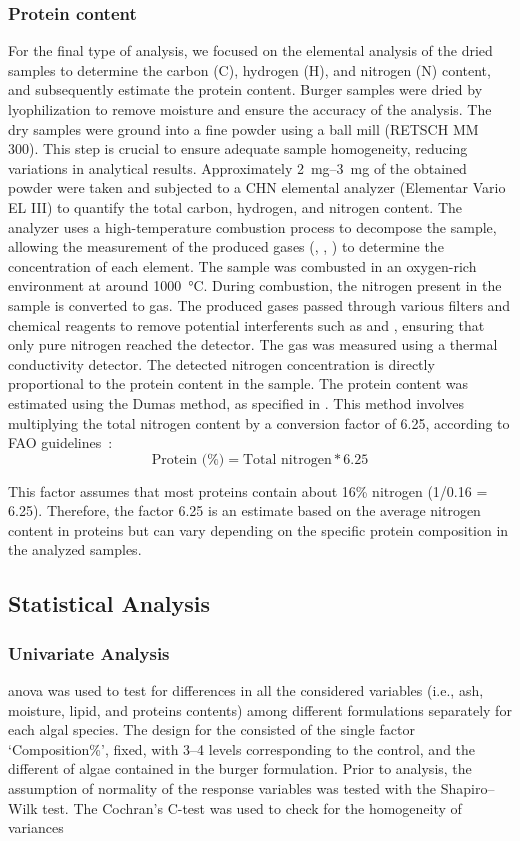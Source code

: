 \subsubsection{Protein content}
For the final type of analysis, we focused on the elemental analysis of the dried samples to determine the carbon (C), hydrogen (H), and nitrogen (N) content, and subsequently estimate the protein content.
Burger samples were dried by lyophilization to remove moisture and ensure the accuracy of the analysis. The dry samples were ground into a fine powder using a ball mill (RETSCH MM 300). This step is crucial to ensure adequate sample homogeneity, reducing variations in analytical results. Approximately \qtyrange{2}{3}{\milli\gram} of the obtained powder were taken and subjected to a CHN elemental analyzer (Elementar Vario EL III) to quantify the total carbon, hydrogen, and nitrogen content. The analyzer uses a high-temperature combustion process to decompose the sample, allowing the measurement of the produced gases (, , ) to determine the concentration of each element.
The sample was combusted in an oxygen-rich environment at around \qty{1000}{\degreeCelsius}. During combustion, the nitrogen present in the sample is converted to  gas. The produced gases passed through various filters and chemical reagents to remove potential interferents such as  and , ensuring that only pure nitrogen reached the detector. The  gas was measured using a thermal conductivity detector. The detected nitrogen concentration is directly proportional to the protein content in the sample.
The protein content was estimated using the Dumas method, as specified in 
. This method involves multiplying the total nitrogen content by a conversion factor of 6.25, according to FAO guidelines~\parencite{fao_2003}:
\[
    \text{Protein (\%)} = \text{Total nitrogen} * 6.25
\]

This factor assumes that most proteins contain about 16\% nitrogen (1/0.16 = 6.25). Therefore, the factor 6.25 is an estimate based on the average nitrogen content in proteins but can vary depending on the specific protein composition in the analyzed samples.

\subsection{Statistical Analysis}
\subsubsection{Univariate Analysis}
\Gls{anova} was used to test for differences in all the considered variables (i.e., ash, moisture, lipid, and proteins contents) among different formulations separately for each algal species. The design for the consisted of the single factor ‘Composition\%’, fixed, with \numrange[range-phrase={--}]{3}{4} levels corresponding to the control, and the different \zxriv{\%} of algae contained in the burger formulation. Prior to analysis, the assumption of normality of the response variables was tested with the Shapiro–Wilk test. The Cochran’s C-test was used to check for the homogeneity of variances 


